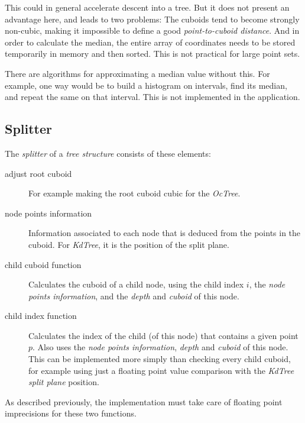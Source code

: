 \documentclass[a4paper,10pt,abstracton,notitlepage]{scrreprt}
\begin{document}
This could in general accelerate descent into a tree. But it does not present an advantage here, and leads to two problems: The cuboids tend to become strongly non-cubic, making it impossible to define a good \emph{point-to-cuboid distance}. And in order to calculate the median, the entire array of coordinates needs to be stored temporarily in memory and then sorted. This is not practical for large point sets.

There are algorithms for approximating a median value without this. For example, one way would be to build a histogram on intervals, find its median, and repeat the same on that interval. This is not implemented in the application.

\subsection{Splitter}
The \emph{splitter} of a \emph{tree structure} consists of these elements:
\begin{description}
\item[adjust root cuboid] For example making the root cuboid cubic for the \emph{OcTree}.
\item[node points information] Information associated to each node that is deduced from the points in the cuboid. For \emph{KdTree}, it is the position of the split plane.
\item[child cuboid function] Calculates the cuboid of a child node, using the child index $i$, the \emph{node points information}, and the \emph{depth} and \emph{cuboid} of this node.
\item[child index function] Calculates the index of the child (of this node) that contains a given point $p$. Also uses the \emph{node points information}, \emph{depth} and \emph{cuboid} of this node. This can be implemented more simply than checking every child cuboid, for example using just a floating point value comparison with the \emph{KdTree} \emph{split plane} position.
\end{description}
As described previously, the implementation must take care of floating point imprecisions for these two functions.
\end{document}
